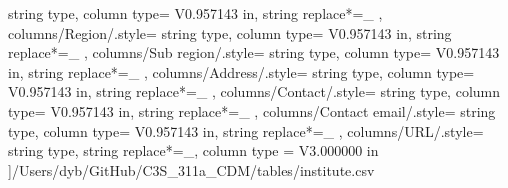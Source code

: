 \begin{landscape}
{            string type, 
            column type= V{0.957143 in}, 
            string replace*={_}{}
        },
    columns/Region/.style={
            string type, 
            column type= V{0.957143 in}, 
            string replace*={_}{}
        },
    columns/Sub region/.style={
            string type, 
            column type= V{0.957143 in}, 
            string replace*={_}{}
        },
    columns/Address/.style={
            string type, 
            column type= V{0.957143 in}, 
            string replace*={_}{}
        },
    columns/Contact/.style={
            string type, 
            column type= V{0.957143 in}, 
            string replace*={_}{}
        },
    columns/Contact email/.style={
            string type, 
            column type= V{0.957143 in}, 
            string replace*={_}{}
        },
    columns/URL/.style={
            string type, 
            string replace*={_}{},
            column type = V{3.000000 in}
        }
    ]{/Users/dyb/GitHub/C3S_311a_CDM/tables/institute.csv}
\end{landscape}
